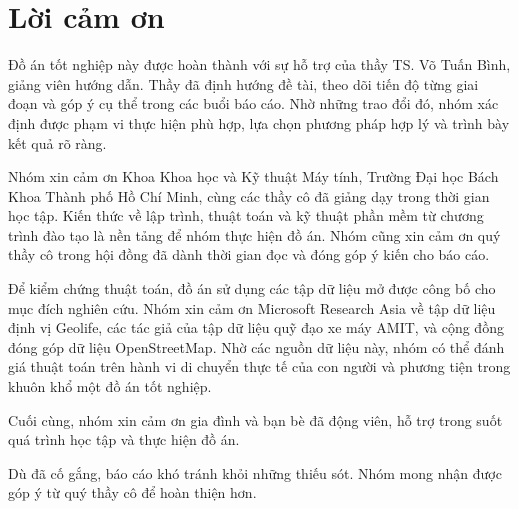 ﻿\section*{Lời cảm ơn}
\thispagestyle{empty}

\hspace{0.5cm} Đồ án tốt nghiệp này được hoàn thành với sự hỗ trợ của thầy TS. Võ Tuấn Bình, giảng viên hướng dẫn. Thầy đã định hướng đề tài, theo dõi tiến độ từng giai đoạn và góp ý cụ thể trong các buổi báo cáo. Nhờ những trao đổi đó, nhóm xác định được phạm vi thực hiện phù hợp, lựa chọn phương pháp hợp lý và trình bày kết quả rõ ràng.

Nhóm xin cảm ơn Khoa Khoa học và Kỹ thuật Máy tính, Trường Đại học Bách Khoa Thành phố Hồ Chí Minh, cùng các thầy cô đã giảng dạy trong thời gian học tập. Kiến thức về lập trình, thuật toán và kỹ thuật phần mềm từ chương trình đào tạo là nền tảng để nhóm thực hiện đồ án. Nhóm cũng xin cảm ơn quý thầy cô trong hội đồng đã dành thời gian đọc và đóng góp ý kiến cho báo cáo.

Để kiểm chứng thuật toán, đồ án sử dụng các tập dữ liệu mở được công bố cho mục đích nghiên cứu. Nhóm xin cảm ơn Microsoft Research Asia về tập dữ liệu định vị Geolife, các tác giả của tập dữ liệu quỹ đạo xe máy AMIT, và cộng đồng đóng góp dữ liệu OpenStreetMap. Nhờ các nguồn dữ liệu này, nhóm có thể đánh giá thuật toán trên hành vi di chuyển thực tế của con người và phương tiện trong khuôn khổ một đồ án tốt nghiệp.

Cuối cùng, nhóm xin cảm ơn gia đình và bạn bè đã động viên, hỗ trợ trong suốt quá trình học tập và thực hiện đồ án.

Dù đã cố gắng, báo cáo khó tránh khỏi những thiếu sót. Nhóm mong nhận được góp ý từ quý thầy cô để hoàn thiện hơn.

\clearpage
